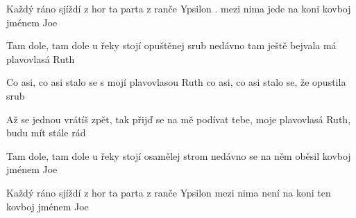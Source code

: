 
\beginverse{}
\lrep{} Každý ráno sjíždí z hor ta parta z ranče Ypsilon \rrep{}.
\lrep{} mezi nima jede na koni kovboj jménem Joe \rrep{}
\endverse{}

\beginverse{}
\lrep{} Tam dole, tam dole u řeky stojí opuštěnej srub \rrep{}
\lrep{} nedávno tam ještě bejvala má plavovlasá Ruth \rrep{}
\endverse{}

\beginverse{}
\lrep{} Co asi, co asi stalo se s mojí plavovlasou Ruth \rrep{}
\lrep{} co asi, co asi stalo se, že opustila srub \rrep{}
\endverse{}

\beginverse{}
\lrep{} Až se jednou vrátíš zpět, tak přijď se na mě podívat \rrep{}
\lrep{} tebe, moje plavovlasá Ruth, budu mít stále rád \rrep{}
\endverse{}

\beginverse{}
\lrep{} Tam dole, tam dole u řeky stojí osamělej strom \rrep{}
\lrep{} nedávno se na něm oběsil kovboj jménem Joe \rrep{}
\endverse{}

\beginverse{}
\lrep{} Každý ráno sjíždí z hor ta parta z ranče Ypsilon \rrep{}
\lrep{} mezi nima není na koni ten kovboj jménem Joe \rrep{}
\endverse{}

\endsong{}
